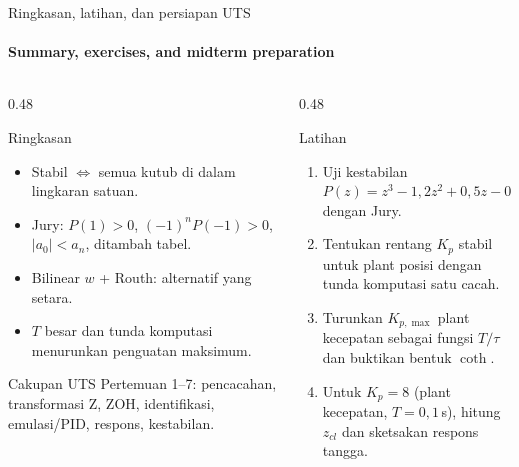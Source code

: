 \documentclass[aspectratio=169,10pt]{beamer}
\begin{document}
\begin{frame}{Ringkasan, latihan, dan persiapan UTS}
	\framesubtitle{Summary, exercises, and midterm preparation}
	\begin{columns}[T]
		\begin{column}{0.48\textwidth}
			\begin{block}{Ringkasan}
				\small
				\begin{itemize}
					\item Stabil $\iff$ semua kutub di dalam lingkaran satuan.
					\item Jury: $P(1)>0$, $(-1)^nP(-1)>0$, $|a_0|<a_n$, ditambah tabel.
					\item Bilinear $w$ + Routh: alternatif yang setara.
					\item $T$ besar dan tunda komputasi menurunkan penguatan maksimum.
				\end{itemize}
			\end{block}
			\begin{exampleblock}{Cakupan UTS}
				\small Pertemuan 1--7: pencacahan, transformasi Z, ZOH, identifikasi, emulasi/PID, respons, kestabilan.
			\end{exampleblock}
		\end{column}
		\begin{column}{0.48\textwidth}
			\begin{exampleblock}{Latihan}
				\small
				\begin{enumerate}
					\item Uji kestabilan $P(z) = z^3 - 1{,}2z^2 + 0{,}5z - 0{,}1$ dengan Jury.
					\item Tentukan rentang $K_p$ stabil untuk plant posisi dengan tunda komputasi satu cacah.
					\item Turunkan $K_{p,\max}$ plant kecepatan sebagai fungsi $T/\tau$ dan buktikan bentuk $\coth$.
					\item Untuk $K_p = 8$ (plant kecepatan, $T=0{,}1$\,s), hitung $z_{cl}$ dan sketsakan respons tangga.
				\end{enumerate}
			\end{exampleblock}
		\end{column}
	\end{columns}
\end{frame}
\end{document}
